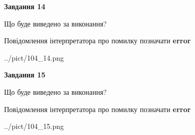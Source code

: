 \documentclass[11pt, ukrainian]{article}
\begin{document}
{\begin {large}
{\begin {center}\textbf{Завдання 14}\end {center}}\par
Що буде виведено за виконання? \par
Повідомлення інтерпретатора про помилку позначати \textbf{error}

\begin{center}
	{../pict/104_14.png}
\end{center}
\newpage

{\begin {center}\textbf{Завдання 15}\end {center}}\par
Що буде виведено за виконання? \par
Повідомлення інтерпретатора про помилку позначати \textbf{error}

\begin{center}
	{../pict/104_15.png}
\end{center}
\newpage

\end {large}}
\end{document}
